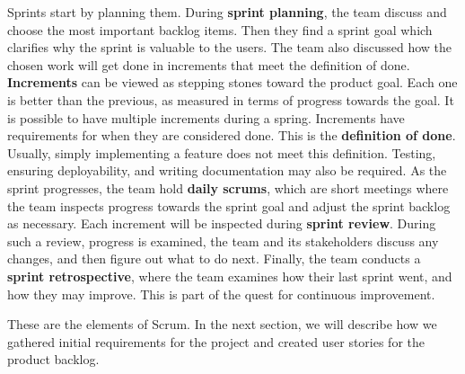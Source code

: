Sprints start by planning them. During \textbf{sprint planning}, the team discuss and choose the most important backlog items. Then they find a sprint goal which clarifies why the sprint is valuable to the users. The team also discussed how the chosen work will get done in increments that meet the definition of done. \textbf{Increments} can be viewed as stepping stones toward the product goal. Each one is better than the previous, as measured in terms of progress towards the goal. It is possible to have multiple increments during a spring. Increments have requirements for when they are considered done. This is the \textbf{definition of done}. Usually, simply implementing a feature does not meet this definition. Testing, ensuring deployability, and writing documentation may also be required.
As the sprint progresses, the team hold \textbf{daily scrums}, which are short meetings where the team inspects progress towards the sprint goal and adjust the sprint backlog as necessary.
Each increment will be inspected during \textbf{sprint review}. During such a review, progress is examined, the team and its stakeholders discuss any changes, and then figure out what to do next.
Finally, the team conducts a \textbf{sprint retrospective}, where the team examines how their last sprint went, and how they may improve. This is part of the quest for continuous improvement.\cite{sutherlandScrumArtDoing2014}

These are the elements of Scrum. In the next section, we will describe how we gathered initial requirements for the project and created user stories for the product backlog.